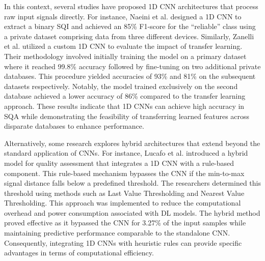 \documentclass[final,3p,times,twocolumn]{elsarticle}
\begin{document}
In this context, several studies have proposed 1D \gls{CNN} architectures that process raw input signals directly.
For instance, Naeini et al. \cite{deep-learning-1} designed a 1D \gls{CNN} to extract a binary \gls{SQI} and achieved an 85\% F1-score for the ``reliable'' class using a private dataset comprising data from three different devices.
Similarly, Zanelli et al. \cite{deep-learning-2} utilized a custom 1D \gls{CNN} to evaluate the impact of transfer learning.
Their methodology involved initially training the model on a primary dataset where it reached 99.8\% accuracy followed by fine-tuning on two additional private databases. 
This procedure yielded accuracies of 93\% and 81\% on the subsequent datasets respectively.
Notably, the model trained exclusively on the second database achieved a lower accuracy of 86\% compared to the transfer learning approach.
These results indicate that 1D \glspl{CNN} can achieve high accuracy in \gls{SQA} while demonstrating the feasibility of transferring learned features across disparate databases to enhance performance.


Alternatively, some research explores hybrid architectures that extend beyond the standard application of \glspl{CNN}.
For instance, Lucafo et al. \cite{deep-learning-3, FIORAVANTI2024105689} introduced a hybrid model for quality assessment that integrates a 1D \gls{CNN} with a rule-based component.
This rule-based mechanism bypasses the \gls{CNN} if the min-to-max signal distance falls below a predefined threshold.
The researchers determined this threshold using methods such as Last Value Thresholding and Nearest Value Thresholding.
This approach was implemented to reduce the computational overhead and power consumption associated with \gls{DL} models.
The hybrid method proved effective as it bypassed the \gls{CNN} for 3.27\% of the input samples while maintaining predictive performance comparable to the standalone \gls{CNN}.
Consequently, integrating 1D \glspl{CNN} with heuristic rules can provide specific advantages in terms of computational efficiency.
\end{document}
